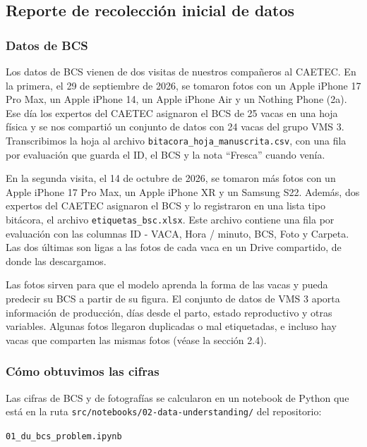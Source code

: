 \subsection{Reporte de recolección inicial de datos}

\subsubsection*{Datos de BCS}

Los datos de BCS vienen de dos visitas de nuestros compañeros al CAETEC. En la primera, el 29 de septiembre de 2026, se tomaron fotos con un Apple iPhone 17 Pro Max, un Apple iPhone 14, un Apple iPhone Air y un Nothing Phone (2a). Ese día los expertos del CAETEC asignaron el BCS de 25 vacas en una hoja física y se nos compartió un conjunto de datos con 24 vacas del grupo VMS 3. Transcribimos la hoja al archivo \texttt{bitacora\_hoja\_manuscrita.csv}, con una fila por evaluación que guarda el ID, el BCS y la nota ``Fresca'' cuando venía.

En la segunda visita, el 14 de octubre de 2026, se tomaron más fotos con un Apple iPhone 17 Pro Max, un Apple iPhone XR y un Samsung S22. Además, dos expertos del CAETEC asignaron el BCS y lo registraron en una lista tipo bitácora, el archivo \texttt{etiquetas\_bsc.xlsx}. Este archivo contiene una fila por evaluación con las columnas ID - VACA, Hora / minuto, BCS, Foto y Carpeta. Las dos últimas son ligas a las fotos de cada vaca en un Drive compartido, de donde las descargamos.

Las fotos sirven para que el modelo aprenda la forma de las vacas y pueda predecir su BCS a partir de su figura. El conjunto de datos de VMS 3 aporta información de producción, días desde el parto, estado reproductivo y otras variables. Algunas fotos llegaron duplicadas o mal etiquetadas, e incluso hay vacas que comparten las mismas fotos (véase la sección 2.4).

\subsubsection*{Cómo obtuvimos las cifras}

Las cifras de BCS y de fotografías se calcularon en un notebook de Python que está en la ruta \nolinkurl{src/notebooks/02-data-understanding/} del repositorio:

\begin{center}
  \nolinkurl{01_du_bcs_problem.ipynb}
\end{center}

